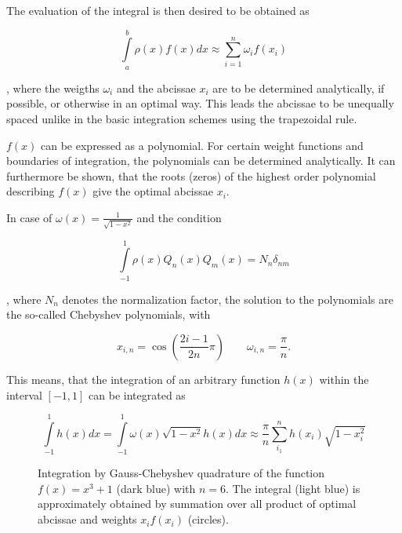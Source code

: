 The evaluation of the integral is then desired to be obtained as

\begin{equation}
  \int\limits_a^b \rho(x) f(x) dx \approx \sum\limits_{i=1}^n \omega_i f(x_i)
\end{equation}

, where the weigths $\omega_i$ and the abcissae $x_i$ are to be determined
analytically, if possible, or otherwise in an optimal way. This leads the abcissae
to be unequally spaced unlike in the basic
integration schemes using the trapezoidal rule.

$f(x)$ can be expressed as a polynomial. For certain weight functions and boundaries
of integration, the
polynomials can be determined analytically.
It can furthermore be shown, that the roots (zeros) of the highest order polynomial
describing $f(x)$ give the optimal abcissae $x_i$.

In case of
$\omega(x)= \frac{1}{\sqrt{1-x^2}}$ and the condition

\begin{equation}
  \int\limits_{-1}^{1} \rho(x) Q_n(x) Q_m(x) = N_n \delta_{nm}
\end{equation}

, where $N_n$ denotes the normalization factor,
the solution to the polynomials are the so-called Chebyshev polynomials, with

\begin{equation}
  x_{i,n} = \cos \left( \frac{2i-1}{2n} \pi \right)
  \quad\quad \omega_{i,n} = \frac \pi n .
\end{equation}

This means, that the integration of an arbitrary function $h(x)$ within
the interval $[-1,1]$ can be integrated as

\begin{equation}
  \int\limits_{-1}^1 h(x) dx = \int\limits_{-1}^1 \omega(x) \sqrt{1-x^2} h(x) dx
  \approx \frac \pi n \sum\limits_{i_1}^n h(x_i) \sqrt{1-x_i^2}

\end{equation}

\begin{figure}[h]
  \centering
  
  \caption{Integration by Gauss-Chebyshev quadrature of the function
           $f(x)=x^3 + 1$ (dark blue) with $n=6$. The integral (light blue)
           is approximately obtained by summation
           over all product of optimal abcissae and weights $x_if(x_i)$ (circles).}
  \label{figure:gaussian_quadrature}
\end{figure}

